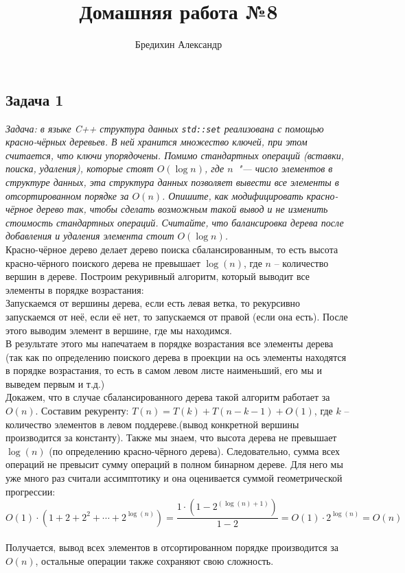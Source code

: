 \documentclass[a4paper,12pt]{article} %
\author{Бредихин Александр}
\title{Домашняя работа №8}
\begin{document}
\maketitle
\subsection*{Задача 1}
\textit{Задача: в языке C++ структура данных \texttt{std::set} реализована с помощью красно-чёрных деревьев. В ней хранится множество ключей, при этом считается, что ключи упорядочены. Помимо стандартных операций (вставки, поиска, удаления), которые стоят $O(\log n)$, где $n$~"--- число элементов в структуре данных, эта структура данных позволяет вывести все элементы в отсортированном порядке за $O(n)$. Опишите, как модифицировать красно-чёрное дерево так, чтобы сделать возможным такой вывод и не изменить стоимость стандартных операций. Считайте, что балансировка дерева после добавления и удаления элемента стоит $O(\log n)$.}\\

Красно-чёрное дерево делает дерево поиска сбалансированным, то есть высота красно-чёрного поиского дерева не превышает $ \log(n) $, где $ n $ -- количество вершин в дереве. Построим рекуривный алгоритм, который выводит все элементы в порядке возрастания:\\

Запускаемся от вершины дерева, если есть левая ветка, то рекурсивно запускаемся от неё, если её нет, то запускаемся от правой (если она есть). После этого выводим элемент в вершине, где мы находимся.\\

В результате этого мы напечатаем в порядке возрастания все элементы дерева (так как по определению поиского дерева в проекции на ось элементы находятся в порядке возрастания, то есть в самом левом листе наименьший, его мы и выведем первым и т.д.) \\
Докажем, что в случае сбалансированного дерева такой алгоритм работает за $O(n)$. Составим рекуренту: $ T(n) = T(k) + T(n-k-1) + O(1) $, где $ k $ -- количество элементов в левом поддереве.(вывод конкретной вершины производится за константу). Также мы знаем, что высота дерева не превышает $\log(n)$ (по определению красно-чёрного дерева). Следовательно, сумма всех операций не превысит сумму операций в полном бинарном дереве. Для него мы уже много раз считали ассимптотику и она оценивается суммой геометрической прогрессии: 
$$ O(1) \cdot (1 + 2 + 2^2 + \cdots + 2^{\log(n)}) = \frac{1 \cdot  \left( 1 - 2^{(\log(n)+1) }\right)}{1-2}  = O(1) \cdot 2^{\log(n)} = O(n)$$\\
Получается, вывод всех элементов в отсортированном порядке производится за $ O(n) $, остальные операции также сохраняют свою сложность.
\end{document}
